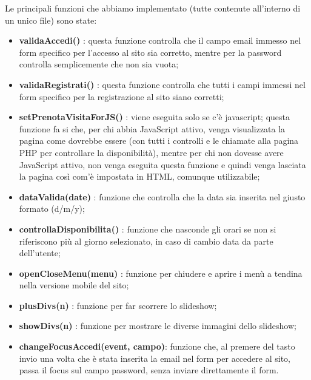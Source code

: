 Le principali funzioni che abbiamo implementato (tutte contenute all’interno di un unico file) sono state:
\begin{itemize}
\item \textbf{validaAccedi()} : questa funzione controlla che il campo email immesso nel form specifico per l'accesso al sito sia corretto, mentre per la password controlla semplicemente che non sia vuota;
\item \textbf{validaRegistrati()} : questa funzione controlla che tutti i campi immessi nel form specifico per la registrazione al sito siano corretti;
\item \textbf{setPrenotaVisitaForJS()} : viene eseguita solo se c'è javascript;
questa funzione fa si che, per chi abbia JavaScript attivo, venga visualizzata la pagina come dovrebbe essere (con tutti i controlli e le chiamate alla pagina PHP per controllare la disponibilità), mentre per chi non dovesse avere JavaScript attivo, non venga eseguita questa funzione e quindi venga lasciata la pagina così com'è impostata in HTML, comunque utilizzabile;
\item \textbf{dataValida(date)} : funzione che controlla che la data sia inserita nel giusto formato (d/m/y);
\item \textbf{controllaDisponibilita()} : funzione che nasconde gli orari se non si riferiscono più al giorno selezionato, in caso di cambio data da parte dell'utente;
\item \textbf{openCloseMenu(menu)} : funzione per chiudere e aprire i menù a tendina nella versione mobile del sito;
\item \textbf{plusDivs(n)} : funzione per far scorrere lo slideshow;
\item \textbf{showDivs(n)} : funzione per mostrare le diverse immagini dello slideshow;
\item \textbf{changeFocusAccedi(event, campo)}: funzione che, al premere del tasto invio una volta che è stata inserita la email nel form per accedere al sito, passa il focus sul campo password, senza inviare direttamente il form. \\
\end{itemize}

\pagebreak

